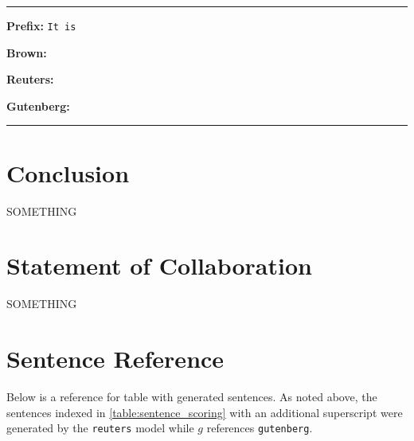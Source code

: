 \documentclass[11pt,a4paper]{article}
\begin{document}
\rule{0.49\textwidth}{0.4pt}
\textbf{Prefix:} \texttt{It is}

\textbf{Brown:} 

\textbf{Reuters:} 

\textbf{Gutenberg:} 

\rule{0.49\textwidth}{0.4pt}
\section{Conclusion}%
\label{sec:conclusion}

SOMETHING




\section{Statement of Collaboration}
SOMETHING






\appendix

\section{Sentence Reference}%
\label{sec:sentence_ref}

Below is a reference for table with generated sentences. As noted above, the sentences indexed in \ref{table:sentence_scoring} with an additional superscript were generated by the \texttt{reuters} model while $g$ references \texttt{gutenberg}.
\end{document}
